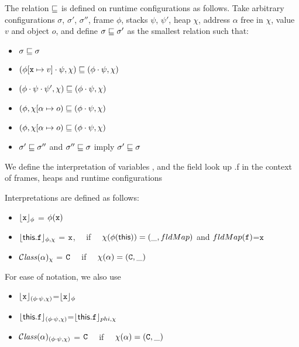 \begin{definition}
The relation $\sqsubseteq$   is defined on runtime configurations as follows. Take arbitrary 
configurations $\sigma$, $\sigma'$, $\sigma''$, frame $\phi$, stacks $\psi$, $\psi'$,  heap $\chi$, address $\alpha$ free in $\chi$, value $v$ and object $o$, and define $\sigma  \sqsubseteq \sigma'$ as the smallest relation such that:

\begin{itemize}
\item 
$\sigma  \sqsubseteq \sigma$
\item
$(\phi[{\mbox{\tt{x}}} \mapsto v]\cdot \psi, \chi) \sqsubseteq  (\phi\cdot \psi, \chi)$ 
\item
$(\phi\cdot\psi\cdot\psi', \chi) \sqsubseteq  (\phi\cdot \psi, \chi)$ 
\item
$(\phi, \chi[\alpha \mapsto o) \sqsubseteq  (\phi\cdot \psi, \chi)$ 
\item
$(\phi, \chi[\alpha \mapsto o) \sqsubseteq  (\phi\cdot \psi, \chi)$ 
\item
$\sigma'  \sqsubseteq \sigma''$ and $\sigma''  \sqsubseteq \sigma$ imply $\sigma'  \sqsubseteq \sigma$
\end{itemize}
\end{definition}

 

We define the interpretation of variables \x, and the field look up  \this.f in the context of frames, 
heaps and runtime configurations

\begin{definition}[Interpretations]
Interpretations are defined as follows:

\begin{itemize}
\item 
${\lfloor{ {{\mbox{\tt{x}}}}}\rfloor_{\phi}} $ = $\phi({\mbox{\tt{x}}})$  
\item
${\lfloor{ {{\bf{\sf {this}}}.{\mbox{\tt{f}}}}}\rfloor_{\phi,\chi}} $ =  ${\mbox{\tt{x}}}$, \ \ if \ \ $\chi(\phi({\bf{\sf {this}}}))=(\_, fldMap)$ and $fldMap({\mbox{\tt{f}}})$=${\mbox{\tt{x}}}$ 
\item
${\mathcal C}{\mathit{lass}}(\alpha)_{\chi} $ = ${\mbox{\tt{C}}}$ \ \ if \ \ $\chi(\alpha)=({\mbox{\tt{C}}},\_)$ 

\end{itemize}

\noindent
For ease of notation, we also use
\begin{itemize}
\item
${\lfloor{ {{\mbox{\tt{x}}}}}\rfloor_{(\phi\cdot\psi,\chi)}} $=${\lfloor{ {{\mbox{\tt{x}}}}}\rfloor_{\phi}} $
\item
${\lfloor{ {{\bf{\sf {this}}}.{\mbox{\tt{f}}}}}\rfloor_{(\phi\cdot\psi,\chi)}} $=${\lfloor{ {{\bf{\sf {this}}}.{\mbox{\tt{f}}}}}\rfloor_{phi,\chi}} $
\item
${\mathcal C}{\mathit{lass}}(\alpha)_{(\phi\cdot\psi,\chi)} $ = ${\mbox{\tt{C}}}$ \ \ if \ \ $\chi(\alpha)=({\mbox{\tt{C}}},\_)$ 
\end{itemize}

\end{definition}


